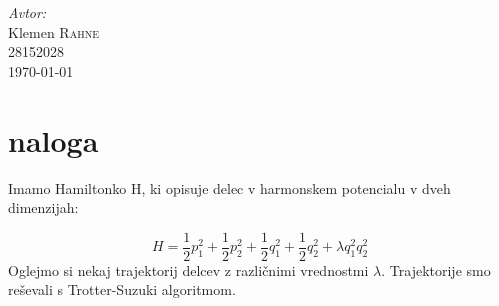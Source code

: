 \documentclass[slovene,11pt,a4paper]{article}
\numberwithin{equation}{section} %
\numberwithin{figure}{section} %
\numberwithin{table}{section} %
\begin{document}
\begin{titlepage}



\Large \emph{Avtor:}\\
Klemen \textsc{Rahne}\\
28152028\\[2cm]

{\large \today } \\[0.5cm] %

	

\end{titlepage}




\section{naloga}

Imamo Hamiltonko H, ki opisuje delec v harmonskem potencialu v dveh dimenzijah:

\begin{equation}
\label{hamiltonka}
H =  \frac{1}{2} p_1^2 +\frac{1}{2} p_2^2 + \frac{1}{2} q_1^2 +\frac{1}{2} q_2^2 + \lambda q_1^2 q_2^2
\end{equation}
Oglejmo si nekaj trajektorij delcev z različnimi vrednostmi $\lambda$. Trajektorije smo reševali s Trotter-Suzuki algoritmom.
\end{document}
